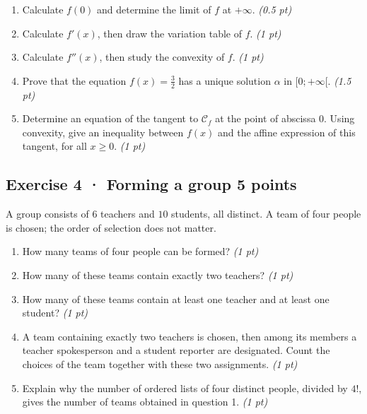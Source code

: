 \begin{enumerate}

\item Calculate $f(0)$ and determine the limit of $f$ at $+\infty$. \hfill\textit{(0.5 pt)}

\item Calculate $f'(x)$, then draw the variation table of $f$. \hfill\textit{(1 pt)}

\item Calculate $f''(x)$, then study the convexity of $f$. \hfill\textit{(1 pt)}

\item Prove that the equation $f(x)=\frac{3}{2}$ has a unique solution $\alpha$ in $[0;+\infty[$. \hfill\textit{(1.5 pt)}

\item Determine an equation of the tangent to $\mathcal C_f$ at the point of abscissa $0$. Using convexity, give an inequality between $f(x)$ and the affine expression of this tangent, for all $x\ge0$. \hfill\textit{(1 pt)}

\end{enumerate}

\subsection*{Exercise 4 · Forming a group \hfill 5 points}A group consists of $6$ teachers and $10$ students, all distinct. A team of four people is chosen; the order of selection does not matter.

\begin{enumerate}

\item How many teams of four people can be formed? \hfill\textit{(1 pt)}

\item How many of these teams contain exactly two teachers? \hfill\textit{(1 pt)}

\item How many of these teams contain at least one teacher and at least one student? \hfill\textit{(1 pt)}

\item A team containing exactly two teachers is chosen, then among its members a teacher spokesperson and a student reporter are designated. Count the choices of the team together with these two assignments. \hfill\textit{(1 pt)}

\item Explain why the number of ordered lists of four distinct people, divided by $4!$, gives the number of teams obtained in question 1. \hfill\textit{(1 pt)}

\end{enumerate}

